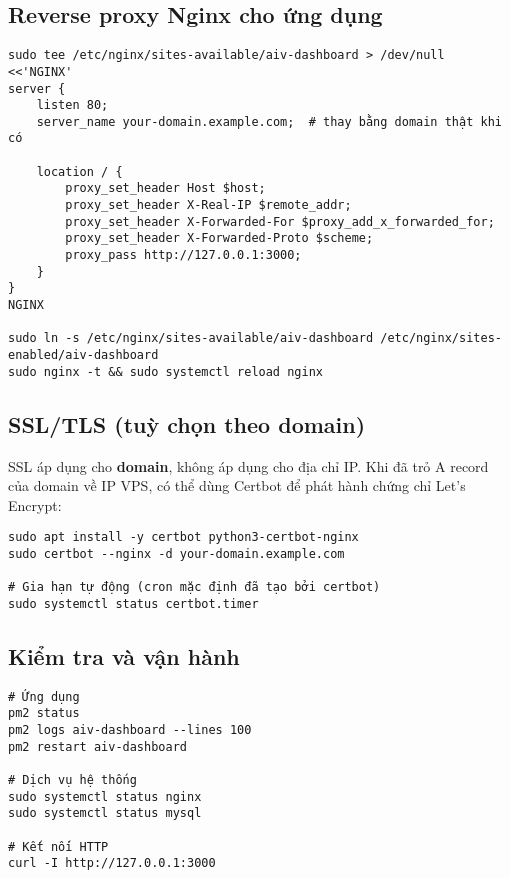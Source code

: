 \documentclass[12pt,a4paper]{article}
\begin{document}
\subsection{Reverse proxy Nginx cho ứng dụng}

\begin{lstlisting}[caption=Reverse proxy tới Next.js trên cổng 3000]
sudo tee /etc/nginx/sites-available/aiv-dashboard > /dev/null <<'NGINX'
server {
    listen 80;
    server_name your-domain.example.com;  # thay bằng domain thật khi có

    location / {
        proxy_set_header Host $host;
        proxy_set_header X-Real-IP $remote_addr;
        proxy_set_header X-Forwarded-For $proxy_add_x_forwarded_for;
        proxy_set_header X-Forwarded-Proto $scheme;
        proxy_pass http://127.0.0.1:3000;
    }
}
NGINX

sudo ln -s /etc/nginx/sites-available/aiv-dashboard /etc/nginx/sites-enabled/aiv-dashboard
sudo nginx -t && sudo systemctl reload nginx
\end{lstlisting}

\subsection{SSL/TLS (tuỳ chọn theo domain)}

SSL áp dụng cho \textbf{domain}, không áp dụng cho địa chỉ IP. Khi đã trỏ A record của domain về IP VPS, có thể dùng Certbot để phát hành chứng chỉ Let's Encrypt:

\begin{lstlisting}[caption=Cài Certbot và cấp chứng chỉ]
sudo apt install -y certbot python3-certbot-nginx
sudo certbot --nginx -d your-domain.example.com

# Gia hạn tự động (cron mặc định đã tạo bởi certbot)
sudo systemctl status certbot.timer
\end{lstlisting}

\subsection{Kiểm tra và vận hành}

\begin{lstlisting}[caption=Các lệnh vận hành thường dùng]
# Ứng dụng
pm2 status
pm2 logs aiv-dashboard --lines 100
pm2 restart aiv-dashboard

# Dịch vụ hệ thống
sudo systemctl status nginx
sudo systemctl status mysql

# Kết nối HTTP
curl -I http://127.0.0.1:3000
\end{lstlisting}
\end{document}
